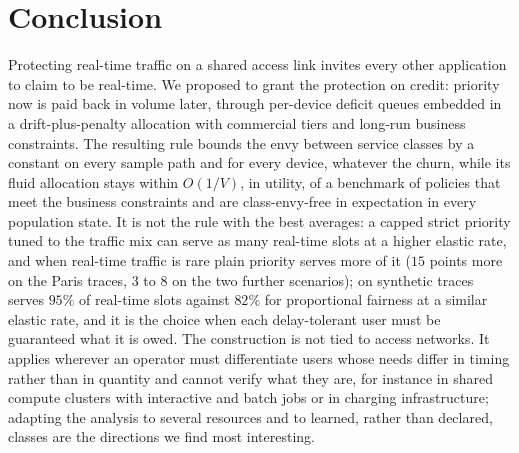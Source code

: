 \section{Conclusion}\label{sec:conclusion}

Protecting real-time traffic on a shared access link invites every other application to claim to be real-time.
We proposed to grant the protection on credit: priority now is paid back in volume later, through per-device deficit queues embedded in a drift-plus-penalty allocation with commercial tiers and long-run business constraints.
The resulting rule bounds the envy between service classes by a constant on every sample path and for every device, whatever the churn, while its fluid allocation stays within $O(1/V)$, in utility, of a benchmark of policies that meet the business constraints and are class-envy-free in expectation in every population state.
It is not the rule with the best averages: a capped strict priority tuned to the traffic mix can serve as many real-time slots at a higher elastic rate, and when real-time traffic is rare plain priority serves more of it ($15$ points more on the Paris traces, $3$ to $8$ on the two further scenarios); on synthetic traces \repay{} serves $95\%$ of real-time slots against $82\%$ for proportional fairness at a similar elastic rate, and it is the choice when each delay-tolerant user must be guaranteed what it is owed.
The construction is not tied to access networks.
It applies wherever an operator must differentiate users whose needs differ in timing rather than in quantity and cannot verify what they are, for instance in shared compute clusters with interactive and batch jobs or in charging infrastructure; adapting the analysis to several resources and to learned, rather than declared, classes are the directions we find most interesting.
